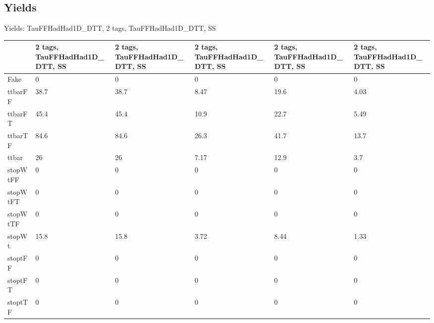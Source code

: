 
\subsection{Yields}

\begin{frame}{Yields: TauFFHadHad1D\_DTT, 2 tags, TauFFHadHad1D\_DTT, SS}
\begin{center}
  \begin{tabular}{l| >{\centering\let\newline\\\arraybackslash\hspace{0pt}}m{1.4cm}| >{\centering\let\newline\\\arraybackslash\hspace{0pt}}m{1.4cm}| >{\centering\let\newline\\\arraybackslash\hspace{0pt}}m{1.4cm}| >{\centering\let\newline\\\arraybackslash\hspace{0pt}}m{1.4cm}| >{\centering\let\newline\\\arraybackslash\hspace{0pt}}m{1.4cm}}
    & 2 tags, TauFFHadHad1D\_DTT, SS & 2 tags, TauFFHadHad1D\_DTT, SS & 2 tags, TauFFHadHad1D\_DTT, SS & 2 tags, TauFFHadHad1D\_DTT, SS & 2 tags, TauFFHadHad1D\_DTT, SS \\
 \hline \hline
    Fake& 0 & 0 & 0 & 0 & 0 \\
 \hline
    ttbarFF& 38.7 & 38.7 & 8.47 & 19.6 & 4.03 \\
 \hline
    ttbarFT& 45.4 & 45.4 & 10.9 & 22.7 & 5.49 \\
 \hline
    ttbarTF& 84.6 & 84.6 & 26.3 & 41.7 & 13.7 \\
 \hline
    ttbar& 26 & 26 & 7.17 & 12.9 & 3.7 \\
 \hline
    stopWtFF& 0 & 0 & 0 & 0 & 0 \\
 \hline
    stopWtFT& 0 & 0 & 0 & 0 & 0 \\
 \hline
    stopWtTF& 0 & 0 & 0 & 0 & 0 \\
 \hline
    stopWt& 15.8 & 15.8 & 3.72 & 8.44 & 1.33 \\
 \hline
    stoptFF& 0 & 0 & 0 & 0 & 0 \\
 \hline
    stoptFT& 0 & 0 & 0 & 0 & 0 \\
 \hline
    stoptTF& 0 & 0 & 0 & 0 & 0 \\

\end{tabular}
\end{center}
\end{frame}

